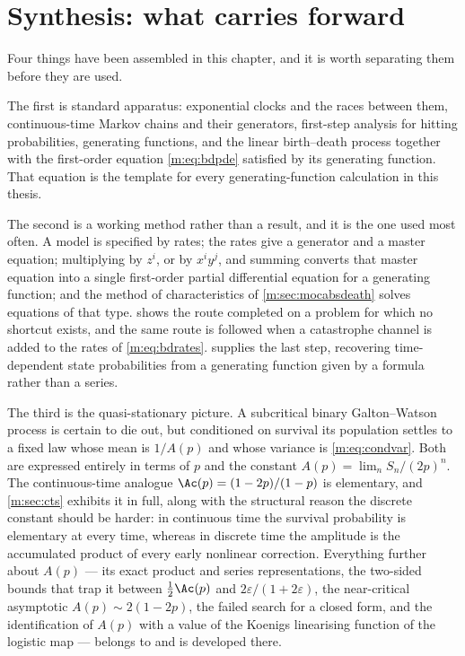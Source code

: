 \section{Synthesis: what carries forward}
\label{m:sec:synthesis}

Four things have been assembled in this chapter, and it is worth separating them
before they are used.

The first is standard apparatus: exponential clocks and the races between them,
continuous-time Markov chains and their generators, first-step analysis for hitting
probabilities, generating functions, and the linear birth--death process together
with the first-order equation \cref{m:eq:bdpde} satisfied by its generating
function. That equation is the template for every generating-function calculation
in this thesis.

The second is a working method rather than a result, and it is the one used most
often. A model is specified by rates; the rates give a generator and a master
equation; multiplying by $z^i$, or by $x^iy^j$, and summing converts that master
equation into a single first-order partial differential equation for a generating
function; and the method of characteristics of \cref{m:sec:mocabsdeath} solves
equations of that type.  shows the route completed on a problem for
which no shortcut exists, and the same route is followed
 when a catastrophe channel is added to the rates
of \cref{m:eq:bdrates}.  supplies the last step, recovering
time-dependent state probabilities from a generating function given by a formula
rather than a series.

The third is the quasi-stationary picture. A subcritical binary Galton--Watson
process is certain to die out, but conditioned on survival its population settles
to a fixed law whose mean is $1/A(p)$ and whose variance is \cref{m:eq:condvar}.
Both are expressed entirely in terms of $p$ and the constant
$A(p) = \lim_n S_n/(2p)^n$. The continuous-time analogue $\Ac(p) = (1-2p)/(1-p)$ is
elementary, and \cref{m:sec:cts} exhibits it in full, along with the structural
reason the discrete constant should be harder: in continuous time the survival
probability is elementary at every time, whereas in discrete time the amplitude is
the accumulated product of every early nonlinear correction. Everything further
about $A(p)$ --- its exact product and series representations, the two-sided bounds
that trap it between $\tfrac12\Ac(p)$ and $2\varepsilon/(1+2\varepsilon)$, the
near-critical asymptotic $A(p)\sim2(1-2p)$, the failed search for a closed form, and
the identification of $A(p)$ with a value of the Koenigs linearising function of the
logistic map --- belongs to \ChA{} and is developed there.

